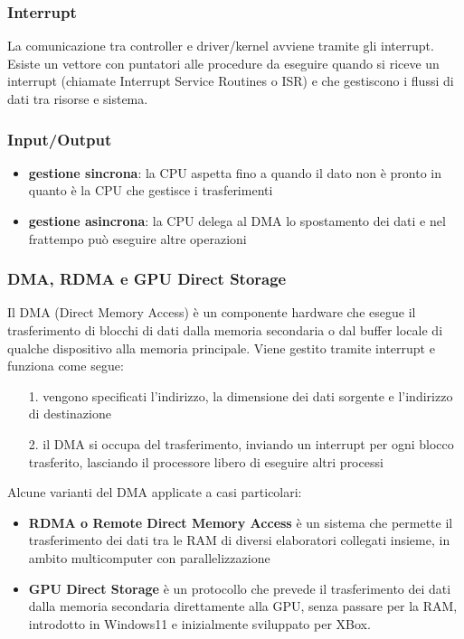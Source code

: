 \documentclass[a4paper]{article}
\begin{document}
\subsubsection*{Interrupt}
La comunicazione tra controller e driver/kernel avviene tramite gli interrupt. Esiste un vettore con puntatori alle procedure da
eseguire quando si riceve un interrupt (chiamate Interrupt Service Routines o ISR) e che gestiscono i flussi di dati tra risorse
e sistema.

\subsubsection*{Input/Output}
\begin{itemize}
	\item \textbf{gestione sincrona}: la CPU aspetta fino a quando il dato non è pronto in quanto è la CPU che gestisce i trasferimenti
	\item \textbf{gestione asincrona}: la CPU delega al DMA lo spostamento dei dati e nel frattempo può eseguire altre operazioni
\end{itemize}

\subsubsection*{DMA, RDMA e GPU Direct Storage}
Il DMA (Direct Memory Access) è un componente hardware che esegue il trasferimento di blocchi di dati dalla memoria secondaria o
dal buffer locale di qualche dispositivo alla memoria principale. Viene gestito tramite interrupt e funziona come segue:
\begin{itemize}
	\item[1.] vengono specificati l'indirizzo, la dimensione dei dati sorgente e l'indirizzo di destinazione
	\item[2.] il DMA si occupa del trasferimento, inviando un interrupt per ogni blocco trasferito, lasciando il processore
	libero di eseguire altri processi
\end{itemize}
Alcune varianti del DMA applicate a casi particolari:
\begin{itemize}
	\item \textbf{RDMA o Remote Direct Memory Access} è un sistema che permette il trasferimento dei dati tra le RAM di diversi elaboratori
	collegati insieme, in ambito multicomputer con parallelizzazione
	\item \textbf{GPU Direct Storage} è un protocollo che prevede il trasferimento dei dati dalla memoria secondaria direttamente alla GPU,
	senza passare per la RAM, introdotto in Windows11 e inizialmente sviluppato per XBox.
\end{itemize}
\end{document}
